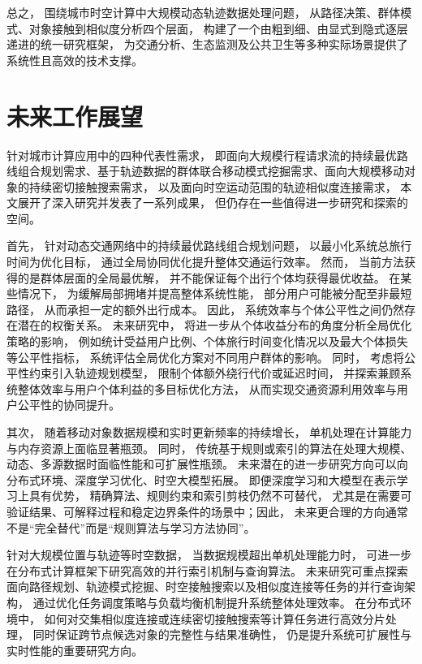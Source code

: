 总之， 围绕城市时空计算中大规模动态轨迹数据处理问题， 从路径决策、群体模式、对象接触到相似度分析四个层面， 构建了一个由粗到细、由显式到隐式逐层递进的统一研究框架， 为交通分析、生态监测及公共卫生等多种实际场景提供了系统性且高效的技术支撑。

\section{未来工作展望}
针对城市计算应用中的四种代表性需求， 即面向大规模行程请求流的持续最优路线组合规划需求、基于轨迹数据的群体联合移动模式挖掘需求、面向大规模移动对象的持续密切接触搜索需求， 以及面向时空运动范围的轨迹相似度连接需求， 本文展开了深入研究并发表了一系列成果， 但仍存在一些值得进一步研究和探索的空间。

首先， 针对动态交通网络中的持续最优路线组合规划问题， 以最小化系统总旅行时间为优化目标， 通过全局协同优化提升整体交通运行效率。 然而， 当前方法获得的是群体层面的全局最优解， 并不能保证每个出行个体均获得最优收益。 在某些情况下， 为缓解局部拥堵并提高整体系统性能， 部分用户可能被分配至非最短路径， 从而承担一定的额外出行成本。 因此， 系统效率与个体公平性之间仍然存在潜在的权衡关系。 未来研究中， 将进一步从个体收益分布的角度分析全局优化策略的影响， 例如统计受益用户比例、个体旅行时间变化情况以及最大个体损失等公平性指标， 系统评估全局优化方案对不同用户群体的影响。 同时， 考虑将公平性约束引入轨迹规划模型， 限制个体额外绕行代价或延迟时间， 并探索兼顾系统整体效率与用户个体利益的多目标优化方法， 从而实现交通资源利用效率与用户公平性的协同提升。

其次， 随着移动对象数据规模和实时更新频率的持续增长， 单机处理在计算能力与内存资源上面临显著瓶颈。 同时， 传统基于规则或索引的算法在处理大规模、动态、多源数据时面临性能和可扩展性瓶颈。 未来潜在的进一步研究方向可以向分布式环境、深度学习优化、时空大模型拓展。
即便深度学习和大模型在表示学习上具有优势， 精确算法、规则约束和索引剪枝仍然不可替代， 尤其是在需要可验证结果、可解释过程和稳定边界条件的场景中；因此， 未来更合理的方向通常不是“完全替代”而是“规则算法与学习方法协同”。




针对大规模位置与轨迹等时空数据， 当数据规模超出单机处理能力时， 可进一步在分布式计算框架下研究高效的并行索引机制与查询算法。 未来研究可重点探索面向路径规划、轨迹模式挖掘、时空接触搜索以及相似度连接等任务的并行查询架构， 通过优化任务调度策略与负载均衡机制提升系统整体处理效率。 在分布式环境中， 如何对交集相似度连接或连续密切接触搜索等计算任务进行高效分片处理， 同时保证跨节点候选对象的完整性与结果准确性， 仍是提升系统可扩展性与实时性能的重要研究方向。

